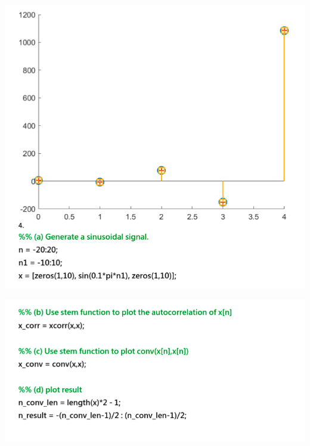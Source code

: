 \documentclass[a4paper]{article}
\begin{document}
	\begin{center}
		\includegraphics[width=1\linewidth]{screenshot028}
	\end{center}
	\begin{center}
		\includegraphics[width=1\linewidth]{screenshot029}
	\end{center}
	
\end{document}
